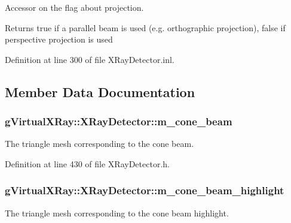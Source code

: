 Accessor on the flag about projection. 

\begin{DoxyReturn}{Returns}
true if a parallel beam is used (e.g. orthographic projection), false if perspective projection is used 
\end{DoxyReturn}


Definition at line 300 of file XRayDetector.inl.



\subsection{Member Data Documentation}
\hypertarget{classg_virtual_x_ray_1_1_x_ray_detector_a60e4ff579d75738cc9f91236b5dde9cc}{
\subsubsection[{m\_\-cone\_\-beam}]{ {\bf gVirtualXRay::XRayDetector::m\_\-cone\_\-beam}}}
\label{classg_virtual_x_ray_1_1_x_ray_detector_a60e4ff579d75738cc9f91236b5dde9cc}


The triangle mesh corresponding to the cone beam. 



Definition at line 430 of file XRayDetector.h.

\hypertarget{classg_virtual_x_ray_1_1_x_ray_detector_a8b5bc9482b244b0b1fe309df2d4300e7}{
\subsubsection[{m\_\-cone\_\-beam\_\-highlight}]{ {\bf gVirtualXRay::XRayDetector::m\_\-cone\_\-beam\_\-highlight}}}
\label{classg_virtual_x_ray_1_1_x_ray_detector_a8b5bc9482b244b0b1fe309df2d4300e7}


The triangle mesh corresponding to the cone beam highlight. 



